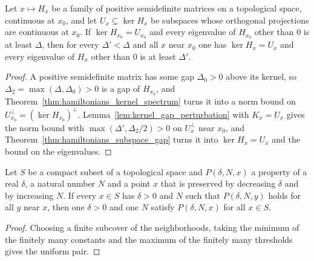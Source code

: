 \begin{theorem}
    \label{thm:hamiltonians_subspace_gap_continuity}
    \leanok
    Let $x\mapsto H_x$ be a family of positive semidefinite matrices on a
    topological space, continuous at $x_0$, and let $U_x\subseteq\ker H_x$ be
    subspaces whose orthogonal projections are continuous at $x_0$. If
    $\ker H_{x_0}=U_{x_0}$ and every eigenvalue of $H_{x_0}$ other than $0$ is at
    least $\Delta$, then for every $\Delta'<\Delta$ and all $x$ near $x_0$ one has
    $\ker H_x=U_x$ and every eigenvalue of $H_x$ other than $0$ is at least $\Delta'$.
\end{theorem}
\begin{proof}\leanok
    A positive semidefinite matrix has some gap $\Delta_0>0$ above its kernel, so
    $\Delta_2=\max(\Delta,\Delta_0)>0$ is a gap of $H_{x_0}$, and
    Theorem~\ref{thm:hamiltonians_kernel_spectrum} turns it into a norm bound on
    $U_{x_0}^\perp=(\ker H_{x_0})^\perp$. Lemma~\ref{lem:kernel_gap_perturbation}
    with $K_x=U_x$ gives the norm bound with $\max(\Delta',\Delta_2/2)>0$ on
    $U_x^\perp$ near $x_0$, and Theorem~\ref{thm:hamiltonians_subspace_gap} turns
    it into $\ker H_x=U_x$ and the bound on the eigenvalues.
\end{proof}

\begin{lemma}
    \label{lem:compact_uniform_pos_nat_bounds}
    \leanok
    Let $S$ be a compact subset of a topological space and $P(\delta,N,x)$ a
    property of a real $\delta$, a natural number $N$ and a point $x$ that is
    preserved by decreasing $\delta$ and by increasing $N$. If every $x\in S$
    has $\delta>0$ and $N$ such that $P(\delta,N,y)$ holds for all $y$ near $x$,
    then one $\delta>0$ and one $N$ satisfy $P(\delta,N,x)$ for all $x\in S$.
\end{lemma}
\begin{proof}\leanok
    Choosing a finite subcover of the neighborhoods, taking the minimum of the
    finitely many constants and the maximum of the finitely many thresholds
    gives the uniform pair.
\end{proof}

